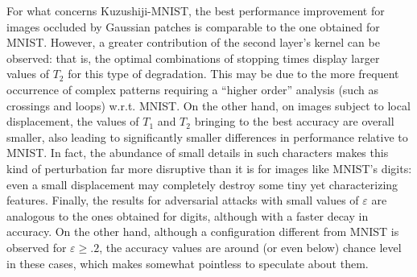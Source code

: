 \documentclass[11pt,oneside,reqno]{amsart}
\begin{document}
 For what concerns Kuzushiji-MNIST, the best performance improvement for images occluded by Gaussian patches is comparable to the one obtained for MNIST. However, a greater contribution of the second layer's kernel can be observed: that is, the optimal combinations of stopping times display larger values of $T_2$ for this type of degradation. This may be due to the more frequent occurrence of complex patterns requiring a ``higher order'' analysis (such as crossings and loops) w.r.t. MNIST. On the other hand, on images subject to local displacement, the values of $T_1$ and $T_2$ bringing to the best accuracy are overall smaller, also leading to significantly smaller differences in performance relative to MNIST. In fact, the abundance of small details in such characters makes this kind of perturbation far more disruptive than it is for images like MNIST's digits: even a small displacement may completely destroy some tiny yet characterizing features. Finally, the results for adversarial attacks with small values of $\varepsilon$ are analogous to the ones obtained for digits, although with a faster decay in accuracy. On the other hand, although a configuration different from MNIST is observed for $\varepsilon\geq.2$, the accuracy values are around (or even below) chance level in these cases, which makes somewhat pointless to speculate about them.
 
\end{document}
